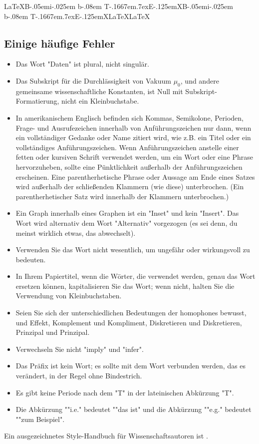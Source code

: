 \documentclass[conference]{IEEEtran}
\def\BibTeX{{\rm B\kern-.05em{\sc i\kern-.025em b}\kern-.08em
    T\kern-.1667em\lower.7ex\hbox{E}\kern-.125emX}}
\begin{document}
{\LaTeX}{\BibTeX}{\BibTeX}{\LaTeX}{\LaTeX}\subsection{Einige häufige Fehler}\label{SCM}
\begin{itemize}
\item Das Wort "Daten" ist plural, nicht singulär.
\item Das Subskript für die Durchlässigkeit von Vakuum $\mu_{0}$, und andere gemeinsame wissenschaftliche Konstanten, ist Null mit Subskript-Formatierung, nicht ein Kleinbuchstabe.
\item In amerikanischem Englisch befinden sich Kommas, Semikolone, Perioden, Frage- und Ausrufezeichen innerhalb von Anführungszeichen nur dann, wenn ein vollständiger Gedanke oder Name zitiert wird, wie z.B. ein Titel oder ein vollständiges Anführungszeichen. Wenn Anführungszeichen anstelle einer fetten oder kursiven Schrift verwendet werden, um ein Wort oder eine Phrase hervorzuheben, sollte eine Pünktlichkeit außerhalb der Anführungszeichen erscheinen. Eine parentherhetische Phrase oder Aussage am Ende eines Satzes wird außerhalb der schließenden Klammern (wie diese) unterbrochen. (Ein parentherhetischer Satz wird innerhalb der Klammern unterbrochen.)
\item Ein Graph innerhalb eines Graphen ist ein "Inset" und kein "Insert". Das Wort wird alternativ dem Wort "Alternativ" vorgezogen (es sei denn, du meinst wirklich etwas, das abwechselt).
\item Verwenden Sie das Wort nicht wesentlich, um ungefähr oder wirkungsvoll zu bedeuten.
\item In Ihrem Papiertitel, wenn die Wörter, die verwendet werden, genau das Wort ersetzen können, kapitalisieren Sie das Wort; wenn nicht, halten Sie die Verwendung von Kleinbuchstaben.
\item Seien Sie sich der unterschiedlichen Bedeutungen der homophones bewusst, und Effekt, Komplement und Kompliment, Diskretieren und Diskretieren, Prinzipal und Prinzipal.
\item Verwechseln Sie nicht "imply" und "infer".
\item Das Präfix ist kein Wort; es sollte mit dem Wort verbunden werden, das es verändert, in der Regel ohne Bindestrich.
\item Es gibt keine Periode nach dem "T" in der lateinischen Abkürzung "T".
\item Die Abkürzung ""i.e." bedeutet ""das ist" und die Abkürzung ""e.g." bedeutet ""zum Beispiel".
\end{itemize}
Ein ausgezeichnetes Style-Handbuch für Wissenschaftsautoren ist \cite{b7}.
\end{document}
